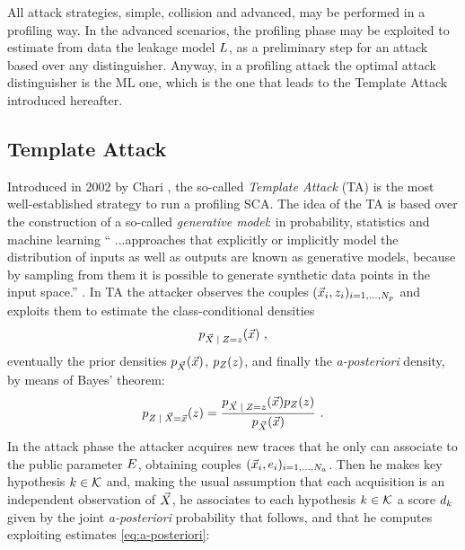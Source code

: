 All attack strategies, simple, collision and advanced, may be performed in a profiling way. In the advanced scenarios, the profiling phase may be exploited to estimate from data the leakage model $L$, as a preliminary step for an attack based over any distinguisher. Anyway, in a profiling attack the optimal attack distinguisher is the ML one, which is the one that leads to the Template Attack introduced hereafter.



\subsection{Template Attack}\label{sec:TA}
Introduced in 2002 by Chari \cite{Chari2003}, the so-called \emph{Template Attack} (TA) is the most well-established strategy to run a profiling SCA. The idea of the TA is based over the construction of a so-called \emph{generative model}: in probability, statistics and machine learning \enquote{ ...approaches that explicitly or implicitly model the distribution of inputs as well as outputs are known as generative models, because by sampling from them it is possible to generate synthetic data points in the input space.} \cite{christopher2006pattern}.
In TA the attacker observes the couples $(\vec{x}_i, z_i)_{i=1, \dots , N_p}$  and exploits them to estimate the class-conditional densities  
\begin{equation}\label{eq:class-conditional}
\pdf_{\given{\vaLeakVec}{\sensRandVar = \sensVar}}(\vLeakVec)\mbox{ ,}
\end{equation}
eventually the prior densities $p_{\vec{X}}(\vec{x})$, $p_{Z}(z)$, and finally the \textit{a-posteriori} density, by means of Bayes' theorem:
\begin{equation}\label{eq:a-posteriori}
\pdf_{\given{\sensRandVar}{  \vaLeakVec = \vLeakVec}}(\sensVar) = \frac{\pdf_{\given{\vaLeakVec}{\sensRandVar = \sensVar}}(\vLeakVec)\pdf_{\sensRandVar}(\sensVar)} {\pdf_{\vaLeakVec}(\vLeakVec)}\mbox{ .}
\end{equation}
In the attack phase the attacker acquires new traces that he only can associate to the public parameter $E$, obtaining couples  $(\vec{x}_i, e_i)_{i=1, \dots , N_a}$. Then he makes key hypothesis $k \in \mathcal{K}$ and, making the usual assumption that each acquisition is an independent observation of $\vec{X}$, he associates to each hypothesis $k \in \mathcal{K}$ a score $d_k$ given by the joint \textit{a-posteriori} probability that follows, and that he computes exploiting estimates \eqref{eq:a-posteriori}:

